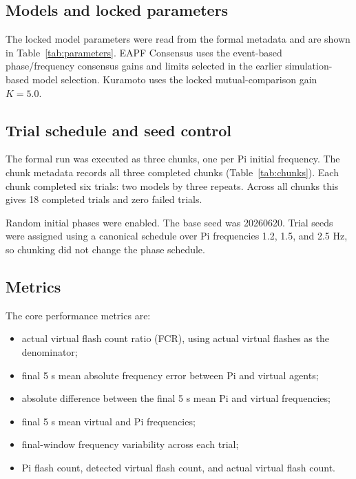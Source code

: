 \documentclass[11pt,a4paper]{article}
\newcommand{\tabledir}{tables}
\begin{document}
\subsection{Models and locked parameters}

The locked model parameters were read from the formal metadata and are shown
in Table~\ref{tab:parameters}. EAPF Consensus uses the event-based
phase/frequency consensus gains and limits selected in the earlier
simulation-based model selection. Kuramoto uses the locked mutual-comparison
gain $K=5.0$.



\subsection{Trial schedule and seed control}

The formal run was executed as three chunks, one per Pi initial frequency. The
chunk metadata records all three completed chunks (Table~\ref{tab:chunks}).
Each chunk completed six trials: two models by three repeats. Across all
chunks this gives 18 completed trials and zero failed trials.

Random initial phases were enabled. The base seed was 20260620. Trial seeds
were assigned using a canonical schedule over Pi frequencies 1.2, 1.5, and
2.5 Hz, so chunking did not change the phase schedule.



\subsection{Metrics}

The core performance metrics are:

\begin{itemize}
  \item actual virtual flash count ratio (FCR), using actual virtual flashes
        as the denominator;
  \item final 5 s mean absolute frequency error between Pi and virtual agents;
  \item absolute difference between the final 5 s mean Pi and virtual
        frequencies;
  \item final 5 s mean virtual and Pi frequencies;
  \item final-window frequency variability across each trial;
  \item Pi flash count, detected virtual flash count, and actual virtual flash
        count.
\end{itemize}
\end{document}
